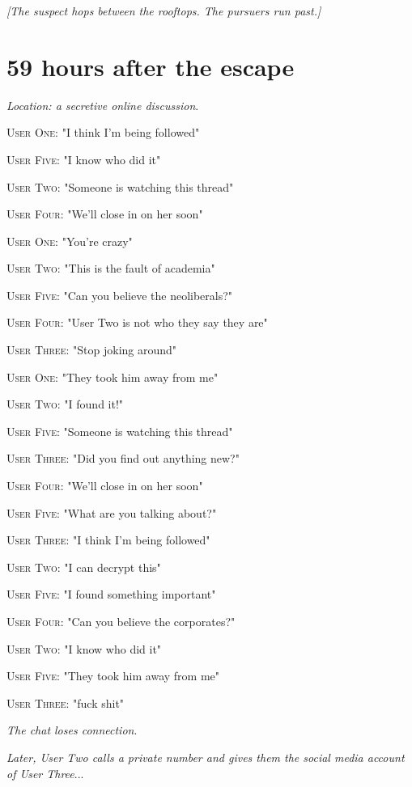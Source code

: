 \documentclass{report}
\begin{document}
\textit{[The suspect hops between the rooftops. The pursuers run past.]}


\section*{59 \small{hours after the escape}}

\textit{Location: a secretive online discussion}. 

\textsc{User One}: "I think I'm being followed" 

\textsc{User Five}: "I know who did it" 

\textsc{User Two}: "Someone is watching this thread" 

\textsc{User Four}: "We'll close in on her soon" 

\textsc{User One}: "You're crazy" 

\textsc{User Two}: "This is the fault of academia" 

\textsc{User Five}: "Can you believe the neoliberals?" 

\textsc{User Four}: "User Two is not who they say they are" 

\textsc{User Three}: "Stop joking around" 

\textsc{User One}: "They took him away from me" 

\textsc{User Two}: "I found it!" 

\textsc{User Five}: "Someone is watching this thread" 

\textsc{User Three}: "Did you find out anything new?" 

\textsc{User Four}: "We'll close in on her soon" 

\textsc{User Five}: "What are you talking about?" 

\textsc{User Three}: "I think I'm being followed" 

\textsc{User Two}: "I can decrypt this" 

\textsc{User Five}: "I found something important" 

\textsc{User Four}: "Can you believe the corporates?" 

\textsc{User Two}: "I know who did it" 

\textsc{User Five}: "They took him away from me" 

\textsc{User Three}: "fuck shit" 

\textit{The chat loses connection}. 

\textit{Later, User Two calls a private number and gives them the social media account of User Three}...
\end{document}
